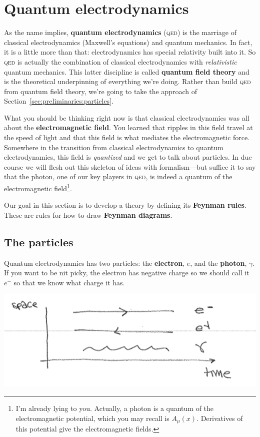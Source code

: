 \documentclass[12pt]{article}
\numberwithin{equation}{section}    %
\newcommand{\acro}[1]{\textsc{\MakeLowercase{#1}}}
\theoremstyle{definition}
\begin{document}
\section{Quantum electrodynamics}

As the name implies, \textbf{quantum electrodynamics} (\acro{QED}) is the marriage of classical electrodynamics (Maxwell's equations) and quantum mechanics. In fact, it is a little more than that: electrodynamics has special relativity built into it. So \acro{QED} is actually the combination of classical electrodynamics with \emph{relativistic} quantum mechanics. This latter discipline is called \textbf{quantum field theory} and is the theoretical underpinning of everything we're doing. Rather than build \acro{QED} from quantum field theory, we're going to take the approach of Section~\ref{sec:preliminaries:particles}. 

What you should be thinking right now is that classical electrodynamics was all about the \textbf{electromagnetic field}. You learned that ripples in this field travel at the speed of light and that this field is what mediates the electromagnetic force. Somewhere in the transition from classical electrodynamics to quantum electrodynamics, this field is \emph{quantized} and we get to talk about particles. In due course we will flesh out this skeleton of ideas with formalism---but suffice it to say that the {photon}, one of our key players in \acro{QED}, is indeed a quantum of the electromagnetic field\footnote{I'm already lying to you. Actually, a photon is a quantum of the electromagnetic potential, which you may recall is $A_\mu(x)$. Derivatives of this potential give the electromagnetic fields.}.

Our goal in this section is to develop a theory by defining its \textbf{Feynman rules}. These are rules for how to draw \textbf{Feynman diagrams}.

\subsection{The particles}

Quantum electrodynamics has two particles: the \textbf{electron}, $e$, and the \textbf{photon}, $\gamma$. If you want to be nit picky, the electron has negative charge so we should call it $e^-$ so that we know what charge it has. 



\includegraphics[width=\textwidth]{Lec1_forward}
\end{document}
